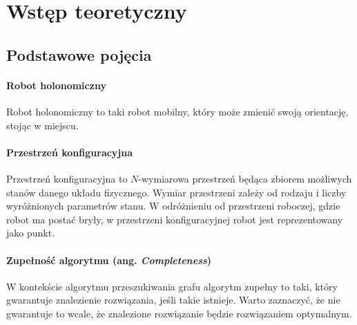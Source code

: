\chapter{Wstęp teoretyczny}
\label{ch:theory}

\section{Podstawowe pojęcia}
\subsubsection{Robot holonomiczny}
Robot holonomiczny to taki robot mobilny, który może zmienić swoją orientację, stojąc w miejscu.

\subsubsection{Przestrzeń konfiguracyjna}
Przestrzeń konfiguracyjna to $N$-wymiarowa przestrzeń będąca zbiorem możliwych stanów danego układu fizycznego.
Wymiar przestrzeni zależy od rodzaju i liczby wyróżnionych parametrów stanu.
W odróżnieniu od przestrzeni roboczej, gdzie robot ma postać bryły, w przestrzeni konfiguracyjnej robot jest reprezentowany jako punkt.

\subsubsection{Zupełność algorytmu (ang. {\it Completeness})}
W kontekście algorytmu przeszukiwania grafu algorytm zupełny to taki, który gwarantuje znalezienie rozwiązania, jeśli takie istnieje.
Warto zaznaczyć, że nie gwarantuje to wcale, że znalezione rozwiązanie będzie rozwiązaniem optymalnym.

